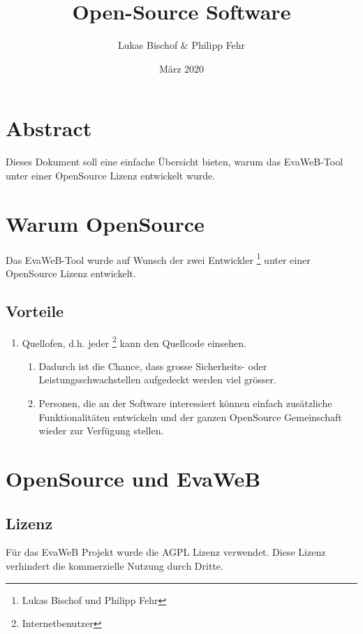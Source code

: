 \documentclass{article}
\title{Open-Source Software}
\author{Lukas Bischof \& Philipp Fehr }
\date{März 2020}
\begin{document}
\maketitle

\section{Abstract}
Dieses Dokument soll eine einfache Übersicht bieten, warum das EvaWeB-Tool unter einer OpenSource Lizenz entwickelt wurde.

\section{Warum OpenSource}
Das EvaWeB-Tool wurde auf Wunsch der zwei Entwickler \footnote{Lukas Bischof und Philipp Fehr} unter einer OpenSource Lizenz entwickelt.

\subsection{Vorteile}
\begin{enumerate}
    \item Quellofen, d.h. jeder \footnote{Internetbenutzer} kann den Quellcode einsehen.
    \begin{enumerate}
        \item Dadurch ist die Chance, dass grosse Sicherheits- oder Leistungsschwachstellen aufgedeckt werden viel grösser.
        \item Personen, die an der Software interessiert können einfach zusätzliche Funktionalitäten entwickeln und der ganzen OpenSource Gemeinschaft wieder zur Verfügung stellen.
    \end{enumerate}
\end{enumerate}

\section{OpenSource und EvaWeB}

\subsection{Lizenz}
Für das EvaWeB Projekt wurde die AGPL \citep{agpl} Lizenz verwendet.
Diese Lizenz verhindert die kommerzielle Nutzung durch Dritte.

\renewcommand{\bibsection}{\section{Quellen}}


\end{document}
